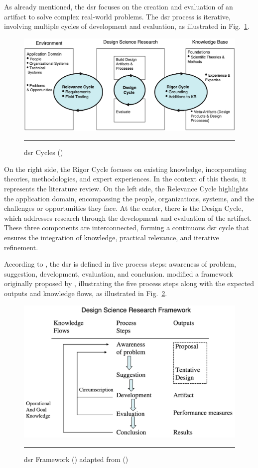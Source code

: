 As already mentioned, the \gls{dsr} focuses on the creation and evaluation of an artifact to solve complex real-world problems.
The \gls{dsr} process is iterative, involving multiple cycles of development and evaluation, as illustrated in Fig.~\ref{fig:design-science-research-cycles}.

\begin{figure}[htbp]
    \centering
 \includegraphics[width=.75\textwidth]{figures/research-design/design-science-research-cycles.png}
     \rule{35em}{0.5pt}
    \caption{\acrlong{dsr} Cycles (\textcite{Hevner2010}) } 
 \label{fig:design-science-research-cycles}
\end{figure}

On the right side, the Rigor Cycle focuses on existing knowledge, incorporating theories, methodologies, and expert experiences.
In the context of this thesis, it represents the literature review.
On the left side, the Relevance Cycle highlights the application domain, encompassing the people, organizations, systems, and the challenges or opportunities they face.
At the center, there is the Design Cycle, which addresses research through the development and evaluation of the artifact.
These three components are interconnected, forming a continuous \gls{dsr} cycle that ensures the integration of knowledge, practical relevance, and iterative refinement.

According to \textcite{Hevner2010}, the \gls{dsr} is defined in five process steps: awareness of problem, suggestion, development, evaluation, and conclusion.
\textcite{Hevner2010} modified a framework originally proposed by \textcite{Vaishnavi2007}, illustrating the five process steps along with the expected outputs and knowledge flows, as illustrated in Fig.~\ref{fig:design-science-research-framework}.

\begin{figure}[htbp]
    \centering
 \includegraphics[width=.75\textwidth]{figures/research-design/design-science-research-framework.png}
     \rule{35em}{0.5pt}
    \caption{\acrlong{dsr} Framework (\textcite{Hevner2010}) adapted from (\textcite{Vaishnavi2007})} 
 \label{fig:design-science-research-framework}
\end{figure}

